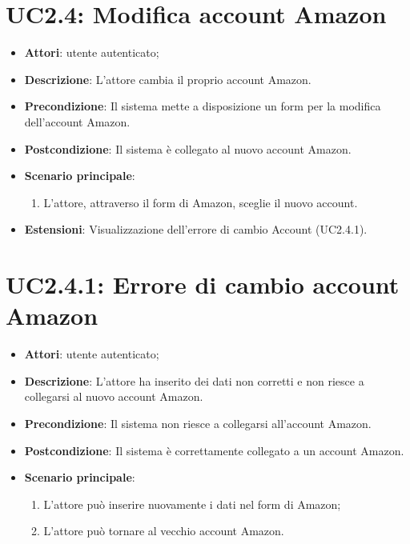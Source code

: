 \section{UC2.4: Modifica account Amazon}
\label{UC2.4}
\begin{itemize}
	\item \textbf{Attori}: utente autenticato;
	\item \textbf{Descrizione}: L'attore cambia il proprio account Amazon.
	\item \textbf{Precondizione}: Il sistema mette a disposizione un form per la modifica dell'account Amazon.
	\item \textbf{Postcondizione}: Il sistema è collegato al nuovo account Amazon.
	\item \textbf{Scenario principale}:
	\begin{enumerate} \item L'attore, attraverso il form di Amazon, sceglie il nuovo account.\end{enumerate}
	\item \textbf{Estensioni}:
	Visualizzazione dell'errore di cambio Account (UC2.4.1).
\end{itemize}

\section{UC2.4.1: Errore di cambio account Amazon}
\label{UC2.4.1}
\begin{itemize}
	\item \textbf{Attori}: utente autenticato;
	\item \textbf{Descrizione}: L'attore ha inserito dei dati non corretti e non riesce a collegarsi al nuovo account Amazon.
	\item \textbf{Precondizione}: Il sistema non riesce a collegarsi all'account Amazon.
	\item \textbf{Postcondizione}: Il sistema è correttamente collegato a un account Amazon.
	\item \textbf{Scenario principale}:
	\begin{enumerate} \item L'attore può inserire nuovamente i dati nel form di Amazon;  \item  L'attore può tornare al vecchio account Amazon.\end{enumerate}
\end{itemize}

